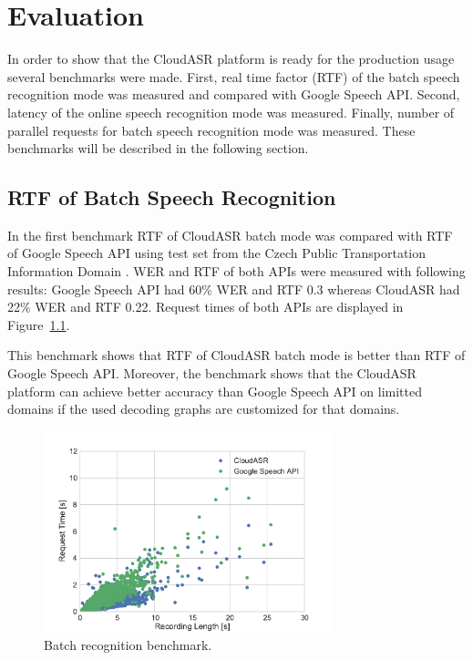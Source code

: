 \chapter{Evaluation}\label{chapter:evaluation}
In order to show that the CloudASR platform is ready for the production usage
  several benchmarks were made.
First, real time factor (RTF) of the batch speech recognition mode was measured and compared with Google Speech API.
Second, latency of the online speech recognition mode was measured.
Finally, number of parallel requests for batch speech recognition mode was measured.
These benchmarks will be described in the following section.


\section{RTF of Batch Speech Recognition}
In the first benchmark RTF of CloudASR batch mode was compared with RTF of Google Speech API
  using test set from the Czech Public Transportation Information Domain \cite{korvas2014vystadial}.
WER and RTF of both APIs were measured with following results:
Google Speech API had 60\% WER and RTF 0.3 whereas
  CloudASR had 22\% WER and RTF 0.22.
Request times of both APIs are displayed in Figure~\ref{fig:batch-benchmark}.

This benchmark shows that RTF of CloudASR batch mode is better than RTF of Google Speech API.
Moreover, the benchmark shows that the CloudASR platform can achieve better accuracy than Google Speech API on limitted domains
  if the used decoding graphs are customized for that domains.

\begin{figure}[h]
  \centering
  \includegraphics[width=0.75\textwidth]{./img/batch.pdf}

  \caption{
    Batch recognition benchmark.
  }
  \label{fig:batch-benchmark}
\end{figure}



